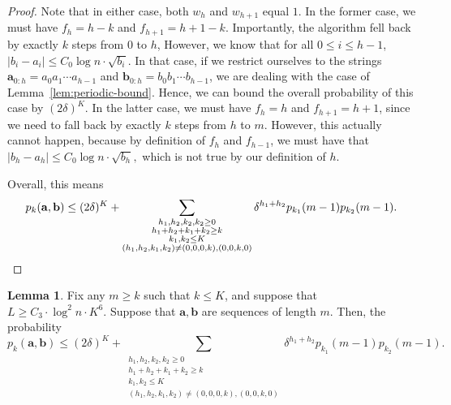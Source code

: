 \documentclass[12pt]{article}
\theoremstyle{definition}
\newtheorem{lemma}[theorem]{Lemma}
\theoremstyle{remark}
\newcommand{\ba}{\mathbf a}
\newcommand{\bb}{\mathbf b}
\begin{document}
\begin{proof}
    Note that in either case, both $w_h$ and $w_{h+1}$ equal $1$. In the former case, we must have $f_{h} = h-k$ and $f_{h+1} = h+1-k$. Importantly, the algorithm fell back by exactly $k$ steps from $0$ to $h$, However, we know that for all $0 \le i \le h-1$, $|b_i-a_i| \le C_0 \log n \cdot \sqrt{b_i}$. In that case, if we restrict ourselves to the strings $\ba_{0:h} = a_0 a_1 \cdots a_{h-1}$ and $\bb_{0:h} = b_0 b_1 \cdots b_{h-1}$, we are dealing with the case of Lemma~\ref{lem:periodic-bound}. Hence, we can bound the overall probability of this case by $(2\delta)^{K}$. In the latter case, we must have $f_{h} = h$ and $f_{h+1} = h+1$, since we need to fall back by exactly $k$ steps from $h$ to $m$. However, this actually cannot happen, because by definition of $f_h$ and $f_{h-1}$, we must have that $|b_h-a_h| \le C_0 \log n \cdot \sqrt{b_h},$ which is not true by our definition of $h$.

    Overall, this means
\[p_k(\ba, \bb) \le (2\delta)^{K} + \sum_{\substack{h_1, h_2, k_2, k_2 \ge 0 \\ h_1+h_2+k_1+k_2 \ge k \\ k_1, k_2 \le K \\ (h_1, h_2, k_1, k_2) \neq (0, 0, 0, k), (0, 0, k, 0)}} \delta^{h_1+h_2} p_{k_1}(m-1) p_{k_2}(m-1). \qedhere\]
\end{proof}

\begin{lemma} \label{lem:no-periodic-bound}
    Fix any $m \ge k$ such that $k \le K$, and suppose that $L \ge C_3 \cdot \log^2 n \cdot K^6$. Suppose that $\ba, \bb$ are sequences of length $m$.
    Then, the probability
\[p_k(\ba, \bb) \le (2\delta)^{K} + \sum_{\substack{h_1, h_2, k_2, k_2 \ge 0 \\ h_1+h_2+k_1+k_2 \ge k \\ k_1, k_2 \le K \\ (h_1, h_2, k_1, k_2) \neq (0, 0, 0, k), (0, 0, k, 0)}} \delta^{h_1+h_2} p_{k_1}(m-1) p_{k_2}(m-1).\]
\end{lemma}
\end{document}
